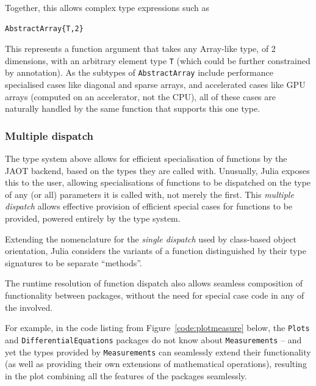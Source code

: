 \documentclass{webofc}
\begin{document}
Together, this allows complex type expressions such as

\begin{verbatim}
AbstractArray{T,2}
\end{verbatim}

This represents a function argument that takes any Array-like type, of 2
dimensions, with an arbitrary element type \texttt{T} (which could be further constrained
by annotation). As the subtypes of \verb$AbstractArray$ include performance
specialised cases like diagonal and sparse arrays, and accelerated cases like
GPU arrays (computed on an accelerator, not the CPU), all of these cases are
naturally handled by the same function that supports this one type. 

\subsubsection{Multiple dispatch}

The type system above allows for efficient specialisation of functions by the
JAOT backend, based on the types they are called with. Unusually, Julia exposes
this to the user, allowing specialisations of functions to be dispatched on the
type of any (or all) parameters it is called with, not merely the first. This
\textit{multiple dispatch} allows effective provision of efficient special cases
for functions to be provided, powered entirely by the type system.

Extending the nomenclature for the \textit{single dispatch} used by
class-based object orientation, Julia considers the variants of a function
distinguished by their type signatures to be separate ``methods''.

The runtime resolution of function dispatch also allows seamless composition
of functionality between packages, without the need for special case
code in any of the involved.

For example, in the code listing from Figure~\ref{code:plotmeasure} below, the
\texttt{Plots} and \texttt{DifferentialEquations} packages do not know about
\texttt{Measurements} -- and yet the types provided by \texttt{Measurements} can
seamlessly extend their functionality (as well as providing their own extensions
of mathematical operations), resulting in the plot combining all the features of
the packages seamlessly.
\end{document}
